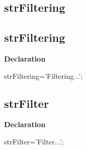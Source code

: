 \documentclass{report}
\newif\ifpdf
\begin{document}
\subsection*{\large{\textbf{strFiltering}}\normalsize\hspace{1ex}\hrulefill}
\else
\subsection*{strFiltering}
\fi
\label{trstrings-strFiltering}
\begin{list}{}{
\setlength{\itemindent}{0cm}
\setlength{\listparindent}{0cm}
\setlength{\leftmargin}{\evensidemargin}
\addtolength{\leftmargin}{\tmplength}
\settowidth{\labelsep}{X}
\addtolength{\leftmargin}{\labelsep}
\setlength{\labelwidth}{\tmplength}
}
\item[\textbf{Declaration}\hfill]
\ifpdf
\begin{flushleft}
\fi
\begin{ttfamily}
strFiltering='Filtering...';\end{ttfamily}

\ifpdf
\end{flushleft}
\fi

\end{list}
\ifpdf
\subsection*{\large{\textbf{strFilter}}\normalsize\hspace{1ex}\hrulefill}
\else
\subsection*{strFilter}
\fi
\label{trstrings-strFilter}
\begin{list}{}{
\setlength{\itemindent}{0cm}
\setlength{\listparindent}{0cm}
\setlength{\leftmargin}{\evensidemargin}
\addtolength{\leftmargin}{\tmplength}
\settowidth{\labelsep}{X}
\addtolength{\leftmargin}{\labelsep}
\setlength{\labelwidth}{\tmplength}
}
\item[\textbf{Declaration}\hfill]
\ifpdf
\begin{flushleft}
\fi
\begin{ttfamily}
strFilter='Filter...';\end{ttfamily}

\ifpdf
\end{flushleft}
\fi

\end{list}
\ifpdf
\end{document}
